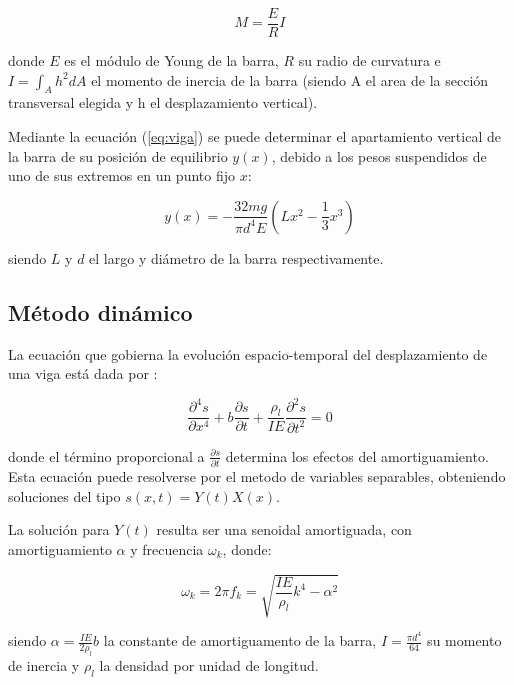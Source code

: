 \documentclass[twoside,twocolumn,a4paper]{article}
\begin{document}
\begin{equation}
\label{eq:viga}
M = \frac{E}{R}I
\end{equation}

donde $E$ es el m\'odulo de Young de la barra, $R$ su radio de curvatura e $I = \int_{A} h^2 dA$ el momento de inercia de la barra (siendo A el area de la secci\'on transversal elegida y h el desplazamiento vertical). \newline

Mediante la ecuaci\'on (\ref{eq:viga}) se puede determinar el apartamiento vertical de la barra de su posici\'on de equilibrio $y(x)$, debido a los pesos suspendidos de uno de sus extremos en un punto fijo $x$:

\begin{equation}
\label{eq:vigafeynman}
y(x) = -\frac{32mg}{\pi d^{4}E}(Lx^{2} - \frac{1}{3}x^{3})
\end{equation}

siendo $L$ y $d$ el largo y di\'ametro de la barra respectivamente.\newline


\subsection{M\'etodo din\'amico}

La ecuaci\'on que gobierna la evoluci\'on espacio-temporal del desplazamiento de una viga est\'a dada por \cite{eq:vigadyns}:

\begin{equation}
\label{eq:vigadyn}
\frac{\partial^4 s}{\partial x^4} + b\frac{\partial s}{\partial t} + \frac{\rho_{l}}{IE} \frac{\partial^2 s}{\partial t^2} = 0
\end{equation}

donde el t\'ermino proporcional a $\frac{\partial s}{\partial t}$ determina los efectos del amortiguamiento. Esta ecuaci\'on puede resolverse por el metodo de variables separables, obteniendo soluciones del tipo $s(x,t) = Y(t)X(x)$. \newline

La soluci\'on para $Y(t)$ resulta ser una senoidal amortiguada, con amortiguamiento $\alpha$ y frecuencia $\omega_{k}$, donde:

\begin{equation}
\label{eq:omegas}
\omega_{k} = 2\pi f_{k} = \sqrt{\frac{IE}{\rho_{l}}k^{4} - \alpha^2}
\end{equation}

siendo $\alpha = \frac{IE}{2\rho_{l}}b$ la constante de amortiguamento de la barra, $I = \frac{\pi d^4}{64}$ su momento de inercia y $\rho_{l}$ la densidad por unidad de longitud. \newline
\end{document}
